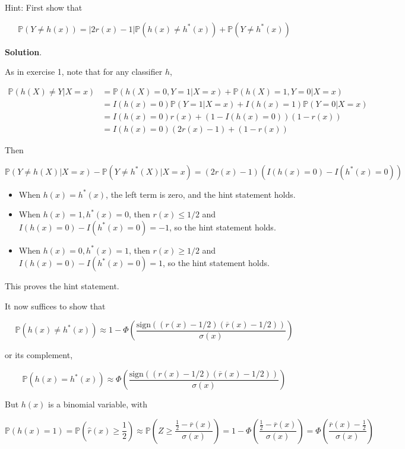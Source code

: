 Hint: First show that

\[ \mathbb{P}(Y \neq h(x)) = |2 r(x) - 1| \mathbb{P}(h(x) \neq h^*(x)) + \mathbb{P}(Y \neq h^*(x))\]

\textbf{Solution}.

As in exercise 1, note that for any classifier \(h\),

\begin{align*}
\mathbb{P}(h(X) \neq Y | X = x) &= \mathbb{P}(h(X) = 0, Y = 1 | X = x) + \mathbb{P}(h(X) = 1, Y = 0 | X = x) \\
&= I(h(x) = 0) \mathbb{P}(Y = 1 | X = x) + I(h(x) = 1) \mathbb{P}(Y = 0 | X = x) \\
&= I(h(x) = 0) r(x) + (1 - I(h(x) = 0)) (1 - r(x)) \\
&= I(h(x) = 0) (2 r(x) - 1) + (1 - r(x))
\end{align*}

Then

\[
\mathbb{P}(Y \neq h(X) | X = x) - \mathbb{P}(Y \neq h^*(X) | X = x) = (2 r(x) - 1) \left(I(h(x) = 0) - I(h^*(x) = 0)\right)
\]

\begin{itemize}[tightlist]
\item
  When \(h(x) = h^*(x)\), the left term is zero, and the hint statement
  holds.
\item
  When \(h(x) = 1, h^*(x) = 0\), then \(r(x) \leq 1/2\) and
  \(I(h(x) = 0) - I(h^*(x) = 0) = -1\), so the hint statement holds.
\item
  When \(h(x) = 0, h^*(x) = 1\), then \(r(x) \geq 1/2\) and
  \(I(h(x) = 0) - I(h^*(x) = 0) = 1\), so the hint statement holds.
\end{itemize}

This proves the hint statement.

It now suffices to show that

\[ \mathbb{P}(h(x) \neq h^*(x)) \approx 1 - \Phi \left( \frac{\text{sign} \left( (r(x) - 1/2) (\overline{r}(x) - 1/2) \right)}{\sigma(x)} \right) \]

or its complement,

\[ \mathbb{P}(h(x) = h^*(x)) \approx \Phi \left( \frac{\text{sign} \left( (r(x) - 1/2) (\overline{r}(x) - 1/2) \right)}{\sigma(x)} \right) \]

But \(h(x)\) is a binomial variable, with

\[ \mathbb{P}(h(x) = 1) = \mathbb{P}\left(\hat{r}(x) \geq \frac{1}{2} \right) \approx \mathbb{P}\left( Z \geq \frac{\frac{1}{2} - \overline{r}(x)}{\sigma(x)} \right) = 1 - \Phi\left( \frac{\frac{1}{2} - \overline{r}(x)}{\sigma(x)} \right) = \Phi\left( \frac{\overline{r}(x) - \frac{1}{2}}{\sigma(x)} \right)\]

